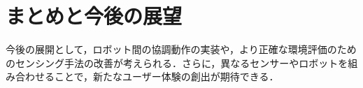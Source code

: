 \documentclass[paper=a4paper,jafontsize=9pt,head_space=15mm,gutter=20mm,
twocolumn,number_of_lines=49, line_length=26zw]{myuarticle}
\begin{document}
\section{まとめと今後の展望}%
今後の展開として，ロボット間の協調動作の実装や，より正確な環境評価のためのセンシング手法の改善が考えられる．さらに，異なるセンサーやロボットを組み合わせることで，新たなユーザー体験の創出が期待できる．



\vspace{5pt}
\renewcommand{\refname}{\normalsize 7.　　参考文献
\vspace{5pt}}
{
  \footnotesize
  
}

\end{document}
